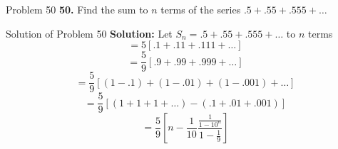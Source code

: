 \documentclass[aspectratio=1610,8pt]{beamer}
\begin{document}
\begin{frame}{Problem 50}
  \textbf{50.} Find the sum to $n$ terms of the series $.5 + .55 + .555 + \ldots$
\end{frame}
\begin{frame}{Solution of Problem 50}
  \textbf{Solution:} Let $S_n = .5 + .55 + .555 +  \ldots$ to $n$ terms
  $$= 5[.1 + .11 + .111 + \ldots]$$
  $$ = \frac{5}{9}[.9 + .99 + .999 + \ldots]$$
  $$= \frac{5}{9}[(1 - .1) + (1 - .01) + (1 - .001) + \ldots]$$
  $$= \frac{5}{9}[(1 + 1 + 1 + \ldots) - (.1 + .01 + .001)]$$
  $$= \frac{5}{9}\left[n - \frac{1}{10}\frac{\frac{1}{1 - 10^n}}{1 - \frac{1}{9}}\right]$$
\end{frame}
\end{document}
